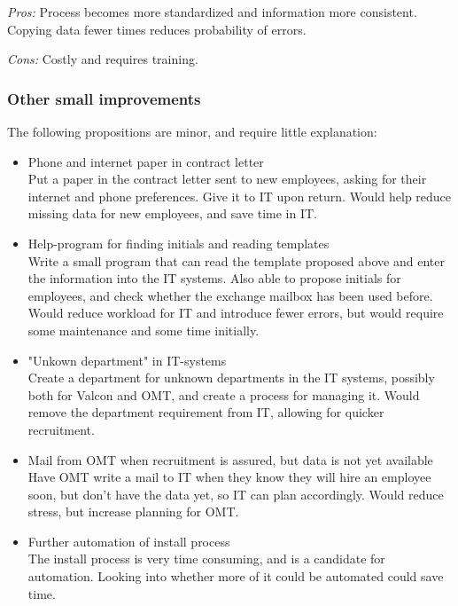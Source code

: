 \noindent \emph{Pros:} Process becomes more standardized and information more consistent. Copying data fewer times reduces probability of errors.

\noindent \emph{Cons:} Costly and requires training.

\subsubsection{Other small improvements}
The following propositions are minor, and require little explanation:
\begin{itemize}
	\item Phone and internet paper in contract letter\\
	
			Put a paper in the contract letter sent to new employees, asking for their internet and phone preferences. Give it to IT upon return. Would help reduce missing data for new employees, and save time in IT.

	\item Help-program for finding initials and reading templates\\
	
			Write a small program that can read the template proposed above and enter the information into the IT systems.
			Also able to propose initials for employees, and check whether the exchange mailbox has been used before.
			Would reduce workload for IT and introduce fewer errors, but would require some maintenance and some time initially.
	
	\item "Unkown department" in IT-systems\\
	
			Create a department for unknown departments in the IT systems, possibly both for Valcon and OMT, and create a process for managing it.
			Would remove the department requirement from IT, allowing for quicker recruitment.
			
	\item Mail from OMT when recruitment is assured, but data is not yet available\\
	
			Have OMT write a mail to IT when they know they will hire an employee soon, but don't have the data yet, so IT can plan accordingly.
			Would reduce stress, but increase planning for OMT.
			
	\item Further automation of install process\\
	
			The install process is very time consuming, and is a candidate for automation.
			Looking into whether more of it could be automated could save time.
\end{itemize}

